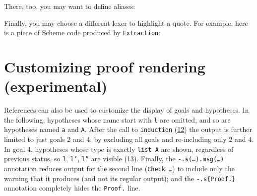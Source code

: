 \documentclass[a4paper]{article}
\begin{document}
There, too, you may want to define aliases:

\begin{quote}
\begin{alectryon}
\end{alectryon}

\begin{alectryon}
\end{alectryon}
\end{quote}

Finally, you may choose a different lexer to highlight a quote.  For example, here is a piece of Scheme code produced by \texttt{Extraction}:

\begin{quote}
\begin{alectryon}
  \begin{\al{message}}
  \end{\al{message}}
\end{alectryon}
\end{quote}


\section{Customizing proof rendering (\textbf{experimental})%
  \label{customizing-proof-rendering-experimental}%
}

References can also be used to customize the display of goals and hypotheses.  In the following, hypotheses whose name start with \texttt{l} are omitted, and so are hypotheses named \texttt{a} and \texttt{A}.  After the call to \texttt{induction} (\hyperref[references-rst-io-pr-s-induction-1-0]{12}) the output is further limited to just goals 2 and 4, by excluding all goals and re-including only 2 and 4.  In goal 4, hypotheses whose type is exactly \texttt{list A} are shown, regardless of previous status, so \texttt{l}, \texttt{l'}, \texttt{l''} are visible (\hyperref[references-rst-io-pr-s-induction-1-g-4-h-l-0]{13}).  Finally, the \texttt{-.s(…).msg(…)} annotation reduces output for the second line (\texttt{Check …}) to include only the warning that it produces (and not its regular output); and the \texttt{-.s\{Proof.\}} annotation completely hides the \texttt{Proof.} line.
\end{document}
